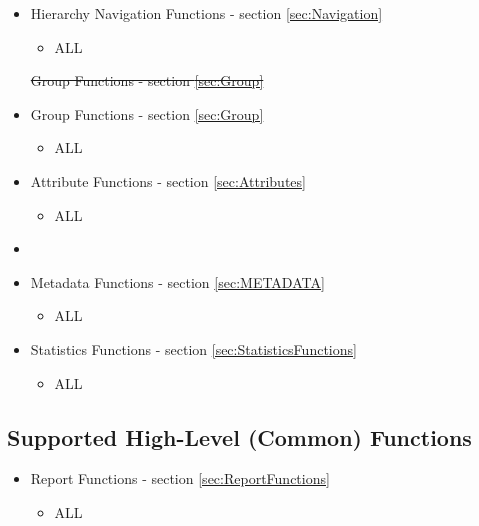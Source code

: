 \documentclass[12pt]{report} %
\providecommand{\DIFdeltex}[1]{{\protect\color{red}\sout{#1}}}                      %
\providecommand{\DIFaddbegin}{} %
\providecommand{\DIFaddend}{} %
\providecommand{\DIFdelbegin}{} %
\providecommand{\DIFdelend}{} %
\providecommand{\DIFdel}[1]{\texorpdfstring{\DIFdeltex{#1}}{}} %
\newcommand{\DIFscaledelfig}{0.5}
\newlength{\DIFdelgraphicswidth} %
\newlength{\DIFdelgraphicsheight} %
\newcommand{\DIFaddincludegraphics}[2][]{{\color{blue}\fbox{\DIFOincludegraphics[#1]{#2}}}} %
\newcommand{\DIFdelincludegraphics}[2][]{%
\sbox{\DIFdelgraphicsbox}{\DIFOincludegraphics[#1]{#2}}%
\settoboxwidth{\DIFdelgraphicswidth}{\DIFdelgraphicsbox} %
\settoboxtotalheight{\DIFdelgraphicsheight}{\DIFdelgraphicsbox} %
\scalebox{\DIFscaledelfig}{%
\parbox[b]{\DIFdelgraphicswidth}{\usebox{\DIFdelgraphicsbox}\\[-\baselineskip] \rule{\DIFdelgraphicswidth}{0em}}\llap{\resizebox{\DIFdelgraphicswidth}{\DIFdelgraphicsheight}{%
\setlength{\unitlength}{\DIFdelgraphicswidth}%
\begin{picture}(1,1)%
\thicklines\linethickness{2pt} %
{\color[rgb]{1,0,0}\put(0,0){\framebox(1,1){}}}%
{\color[rgb]{1,0,0}\put(0,0){\line( 1,1){1}}}%
{\color[rgb]{1,0,0}\put(0,1){\line(1,-1){1}}}%
\end{picture}%
}\hspace*{3pt}}} %
} %
\DeclareRobustCommand{\DIFaddbegin}{\DIFOaddbegin \let\includegraphics\DIFaddincludegraphics} %
\DeclareRobustCommand{\DIFaddend}{\DIFOaddend \let\includegraphics\DIFOincludegraphics} %
\DeclareRobustCommand{\DIFdelbegin}{\DIFOdelbegin \let\includegraphics\DIFdelincludegraphics} %
\DeclareRobustCommand{\DIFdelend}{\DIFOaddend \let\includegraphics\DIFOincludegraphics} %
\begin{document}
\begin{itemize}[noitemsep,nolistsep] 
	\item{Hierarchy Navigation Functions - section \ref{sec:Navigation}}
		\begin{itemize}[noitemsep,nolistsep] 
			\item{ALL}
		\end{itemize}
	\DIFdelbegin %
\DIFdel{Group Functions - section \ref{sec:Group}
	}\DIFdelend \DIFaddbegin \item{Group Functions - section \ref{sec:Group}}
		\DIFaddend \begin{itemize}[noitemsep,nolistsep] 
			\item{ALL}
		\end{itemize}
	\item{Attribute Functions - section \ref{sec:Attributes}}
		\begin{itemize}[noitemsep,nolistsep] 
			\item{ALL}
		\end{itemize}
	\DIFdelbegin %
\item%
\DIFdelend \DIFaddbegin \item{Metadata Functions - section \ref{sec:METADATA}}
		\begin{itemize}[noitemsep,nolistsep] 
			\item{ALL}
		\end{itemize}
	\item{Statistics Functions - section \ref{sec:StatisticsFunctions}}
		\begin{itemize}[noitemsep,nolistsep] 
			\item{ALL}
		\end{itemize}
\end{itemize}


\subsection{Supported High-Level (Common) Functions}\label{sec:UserMCHighLevel}

\begin{itemize}[noitemsep,nolistsep] 
\item{Report Functions - section \ref{sec:ReportFunctions}}
	\begin{itemize}[noitemsep,nolistsep] 
		\item{ALL}
	\end{itemize}
\end{itemize}
\end{document}
